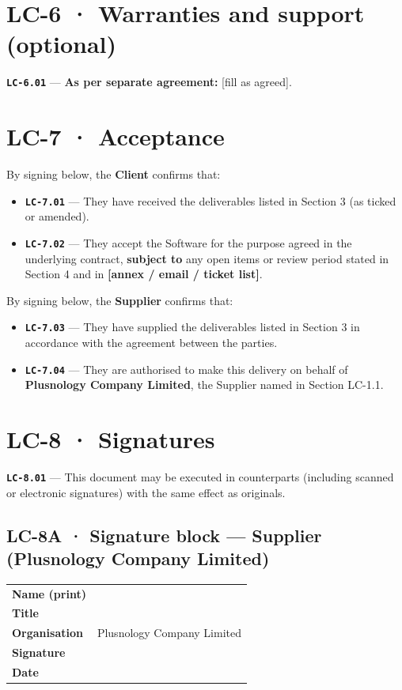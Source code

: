 \documentclass[11pt,a4paper]{article}
\newcommand{\LC}[1]{\textbf{\texttt{#1}}}
\begin{document}
\section*{LC-6 · Warranties and support (optional)}

\noindent\LC{LC-6.01} --- \textbf{As per separate agreement:} [fill as agreed].

\section*{LC-7 · Acceptance}

By signing below, the \textbf{Client} confirms that:

\begin{itemize}
  \item \LC{LC-7.01} --- They have received the deliverables listed in Section 3 (as ticked or amended).
  \item \LC{LC-7.02} --- They accept the Software for the purpose agreed in the underlying contract, \textbf{subject to} any open items or review period stated in Section 4 and in \textbf{[annex / email / ticket list]}.
\end{itemize}

By signing below, the \textbf{Supplier} confirms that:

\begin{itemize}
  \item \LC{LC-7.03} --- They have supplied the deliverables listed in Section 3 in accordance with the agreement between the parties.
  \item \LC{LC-7.04} --- They are authorised to make this delivery on behalf of \textbf{Plusnology Company Limited}, the Supplier named in Section LC-1.1.
\end{itemize}

\section*{LC-8 · Signatures}

\noindent\LC{LC-8.01} --- This document may be executed in counterparts (including scanned or electronic signatures) with the same effect as originals.

\subsection*{LC-8A · Signature block --- Supplier (Plusnology Company Limited)}

\begin{tabular}{@{}p{4cm}p{9cm}@{}}
\toprule
\textbf{Name (print)} & \rule{0pt}{2.2em}\hrulefill \\
\textbf{Title} & \rule{0pt}{2.2em}\hrulefill \\
\textbf{Organisation} & Plusnology Company Limited \\
\textbf{Signature} & \rule{0pt}{2.2em}\hrulefill \\
\textbf{Date} & \rule{0pt}{2.2em}\hrulefill \\
\bottomrule
\end{tabular}
\end{document}
